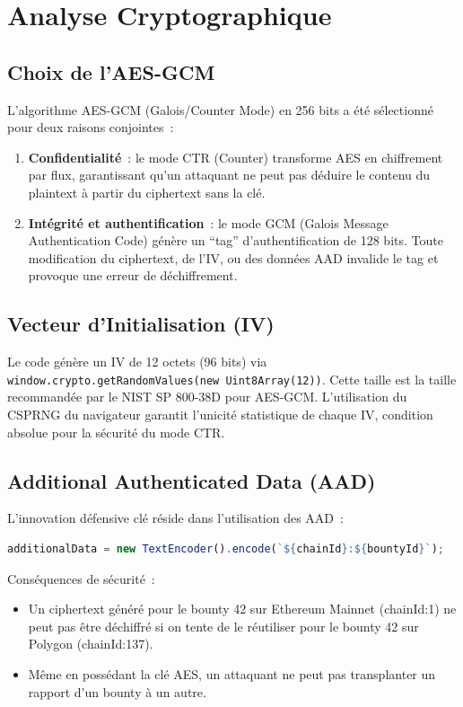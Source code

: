 \documentclass[12pt, a4paper]{report}
\begin{document}
\chapter{Analyse Cryptographique}

\section{Choix de l'AES-GCM}
L'algorithme AES-GCM (Galois/Counter Mode) en 256 bits a \'{e}t\'{e} s\'{e}lectionn\'{e} pour deux raisons conjointes~:
\begin{enumerate}
    \item \textbf{Confidentialit\'{e}}~: le mode CTR (Counter) transforme AES en chiffrement par flux, garantissant qu'un attaquant ne peut pas d\'{e}duire le contenu du plaintext \`{a} partir du ciphertext sans la cl\'{e}.
    \item \textbf{Int\'{e}grit\'{e} et authentification}~: le mode GCM (Galois Message Authentication Code) g\'{e}n\`{e}re un ``tag'' d'authentification de 128 bits. Toute modification du ciphertext, de l'IV, ou des donn\'{e}es AAD invalide le tag et provoque une erreur de d\'{e}chiffrement.
\end{enumerate}

\section{Vecteur d'Initialisation (IV)}
Le code g\'{e}n\`{e}re un IV de 12 octets (96 bits) via \texttt{window.crypto.getRandomValues(new Uint8Array(12))}. Cette taille est la taille recommand\'{e}e par le NIST SP 800-38D pour AES-GCM. L'utilisation du CSPRNG du navigateur garantit l'unicit\'{e} statistique de chaque IV, condition absolue pour la s\'{e}curit\'{e} du mode CTR.

\section{Additional Authenticated Data (AAD)}
L'innovation d\'{e}fensive cl\'{e} r\'{e}side dans l'utilisation des AAD~:
\begin{lstlisting}[language=JavaScript]
additionalData = new TextEncoder().encode(`${chainId}:${bountyId}`);
\end{lstlisting}

Cons\'{e}quences de s\'{e}curit\'{e}~:
\begin{itemize}
    \item Un ciphertext g\'{e}n\'{e}r\'{e} pour le bounty 42 sur Ethereum Mainnet (chainId:1) ne peut pas \^{e}tre d\'{e}chiffr\'{e} si on tente de le r\'{e}utiliser pour le bounty 42 sur Polygon (chainId:137).
    \item M\^{e}me en poss\'{e}dant la cl\'{e} AES, un attaquant ne peut pas transplanter un rapport d'un bounty \`{a} un autre.
\end{itemize}
\end{document}
